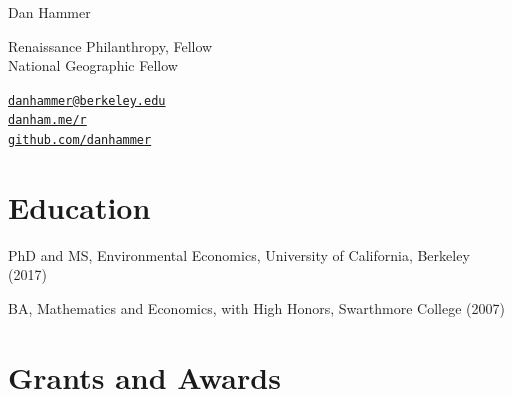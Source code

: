 \documentclass[10pt,letterpaper]{article}
\def\name{Dan Hammer}
\renewenvironment{itemize}{
  \begin{list}{}{
    \setlength{\leftmargin}{1.5em}
    \setlength{\itemsep}{0.25em}
    \setlength{\parskip}{0pt}
    \setlength{\parsep}{0.25em}
  }
}{
  \end{list}
}
\begin{document}
{\huge \name}

\bigskip

\begin{minipage}[t]{0.6\textwidth}
  Renaissance Philanthropy, Fellow\\
  National Geographic Fellow
\end{minipage}%
\hfill
\begin{minipage}[t]{0.3\textwidth}
  \href{mailto:danhammer@berkeley.edu}{\texttt{danhammer@berkeley.edu}}\\
  \href{http://www.danham.me/r}{\texttt{danham.me/r}}\\
  \href{http://www.github.com/danhammer}{\texttt{github.com/danhammer}}
\end{minipage}

\section*{Education}

\begin{itemize}
  \item PhD and MS, Environmental Economics, University of California, Berkeley (2017)
  \item BA, Mathematics and Economics, with High Honors, Swarthmore College (2007)
\end{itemize}

\section*{Grants and Awards}
\end{document}
